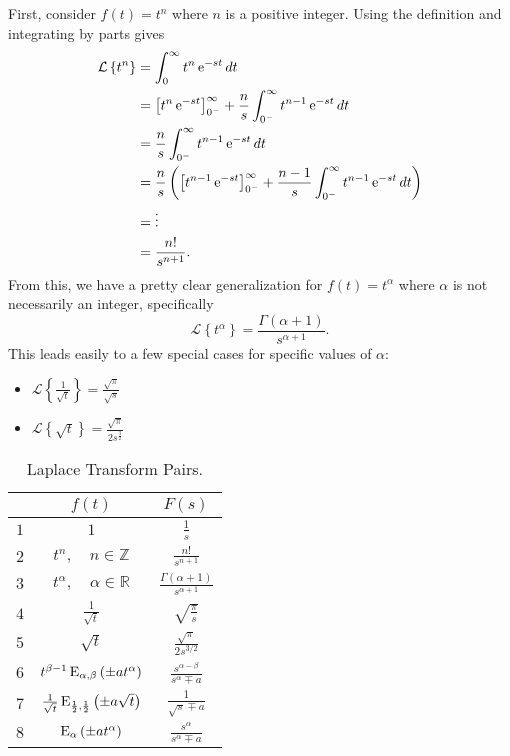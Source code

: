     First, consider $f(t) = t^n$ where $n$ is a positive integer. Using the definition and integrating by parts gives
    \begin{align*}
      \mathcal L \left\{ t^n \right\} &= 
      \int_0^\infty t^n \operatorname{e}^{-s t} dt \\
      &= \left[ t^{n} \operatorname{e}^{-s t} \right]_{0^-}^\infty + \frac{n}{s} \int_{0^-}^\infty t^{n-1} \operatorname{e}^{-s t} dt \\
      &= \frac{n}{s} \int_{0^-}^\infty t^{n-1} \operatorname{e}^{-s t} dt \\
      &= \frac{n}{s} \left( \left[ t^{n-1} \operatorname{e}^{-s t} \right]_{0^-}^\infty + \frac{n-1}{s} \int_{0^-}^\infty t^{n-1} \operatorname{e}^{-s t} dt \right) \\
	&= \vdots  \\
	&= \frac{n!}{s^{n+1}}.
    \end{align*}
    From this, we have a pretty clear generalization for $f(t) = t^\alpha$ where $\alpha$ is not necessarily an integer, specifically
    \begin{equation*}
      \mathcal L \left\{ t^\alpha \right\} = \frac{\Gamma(\alpha + 1)}{s^{\alpha + 1}}.
    \end{equation*}
    This leads easily to a few special cases for specific values of $\alpha$:
    \begin{itemize}
      \item $\mathcal L \left\{ \frac{1}{\sqrt{t}} \right\} = \frac{\sqrt{\pi}}{\sqrt{s}}$
      \item $\mathcal L \left\{ \sqrt{t} \right\} = \frac{\sqrt{\pi}}{2 s^\frac{3}{2}}$
    \end{itemize}

    \begin{table}
      \centering
      \begin{tabular}{|c|c|c|}
	\hline
	 & $f(t)$ & $F(s)$ \\ \hline
	$1$ & $1$ & $\frac{1}{s}$ \\ \hline
	$2$ & $t^n, \quad n \in \mathbb Z$ & $\frac{n!}{s^{n+1}}$ \\ \hline
	$3$ & $t^\alpha, \quad \alpha \in \mathbb R$ & $\frac{\Gamma(\alpha + 1)}{s^{\alpha + 1}}$ \\ \hline
	$4$ & $\frac{1}{\sqrt{t}}$ & $\sqrt{\frac{\pi}{s}} $ \\ \hline
	$5$ & $\sqrt{t}$ & $\frac{\sqrt{\pi}}{2 s^{3/2}} $ \\ \hline
	$6$ & $t^{\beta - 1} \operatorname{E}_{\alpha,\beta}\left( \pm a t^\alpha \right)$ & $ \frac{s^{\alpha - \beta}}{s^\alpha \mp a}$ \\ \hline
	$7$ & $\frac{1}{\sqrt{t}} \operatorname{E}_{\frac{1}{2},\frac{1}{2}}\left( \pm a \sqrt{t} \right)$ & $ \frac{1}{\sqrt{s} \mp a}$ \\ \hline
	$8$ & $\operatorname{E}_{\alpha}\left( \pm a t^\alpha \right)$ & $ \frac{s^{\alpha}}{s^\alpha \mp a}$ \\ \hline
      \end{tabular}
      \caption{Laplace Transform Pairs.}
      \label{tab:ltpairs}
    \end{table}

